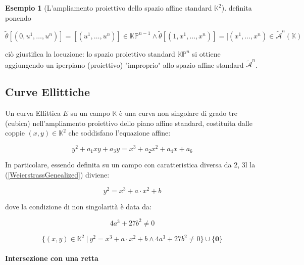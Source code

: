 \documentclass{book}
\theoremstyle{definition}
\newtheorem{esempio}{Esempio}
\newcommand{\CMP}{\mathbb{K}}
\begin{document}
\begin{esempio}[L'ampliamento proiettivo dello spazio affine standard $\mathbb{K}^2$]
definita ponendo

\[
    \tilde{\theta}[(0, u^{1}, \dots, u^{n})] = [(u^{1}, \dots, u^{n})] \in \mathbb{KP}^{n-1} \land \tilde{\theta}[(1, x^{1}, \dots, x^{n})] = [(x^{1}, \dots, x^{n}) \in \tilde{\mathcal{A}}^n(\CMP)
\]

ciò giustifica la locuzione: lo spazio proiettivo standard $\mathbb{KP}^{n}$ si ottiene aggiungendo un iperpiano (proiettivo) "improprio" allo spazio affine standard $\tilde{\mathcal{A}}^n$.

\end{esempio}

\subsection{Curve Ellittiche}

Un curva Ellittica $E$ su un campo $\mathbb{K}$ è una curva non singolare di grado tre (cubica) nell'ampliamento proiettivo dello piano affine standard, costituita dalle coppie
$(x, y) \in \CMP^2$ che soddisfano l'equazione affine:

\begin{equation}
    \label{WeierstrassGenealized}
    y^{2} + a_{1} x y + a_{3} y = x^{3} + a_{2} x^{2} + a_{4} x + a_{6}
\end{equation}

In particolare, essendo definita su un campo con caratteristica diversa da 2, 3l la (\ref{WeierstrassGenealized}) diviene:

\begin{equation}
    \label{EllipticCurveOverFiniteField}
    y^{2} = x^{3} + a \cdot x^{2} + b
\end{equation}

dove la condizione di non singolarità è data da:

\begin{equation}
    \label{nonSingularCondition}
    4 a^{3} + 27 b^{2} \ne 0
\end{equation}

\begin{equation}
    \label{nonSingularCondition}
    \{ (x, y) \in \CMP^2 \ | \ y^{2} = x^{3} + a \cdot x^{2} + b \land 4 a^{3} + 27 b^{2} \ne 0 \} \cup \{\mathbf{0}\}
\end{equation}


\paragraph{Intersezione con una retta}
\end{document}
